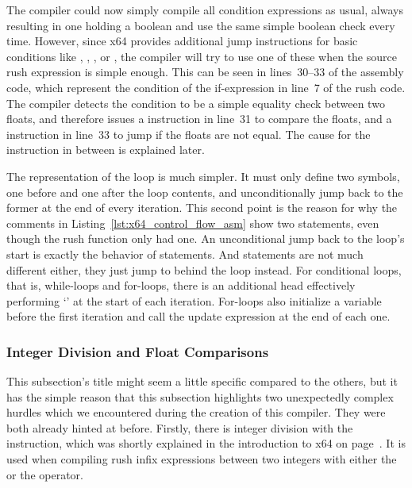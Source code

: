 The compiler could now simply compile all condition expressions as usual, always resulting in one  holding a boolean and use the same simple boolean check every time.
However, since x64 provides additional jump instructions for basic conditions like \qVerb{==}, \qVerb{!=}, \qVerb{>=}, or \qVerb{<}, the compiler will try to use one of these when the source rush expression is simple enough.
This can be seen in lines~30--33 of the assembly code, which represent the condition of the if-expression in line~7 of the rush code.
The compiler detects the condition to be a simple equality check between two floats, and therefore issues a  instruction in line~31 to compare the floats, and a  instruction in line~33 to jump if the floats are not equal.
The cause for the \label{x64_ucomisd} instruction in between is explained later.


The representation of the loop is much simpler.
It must only define two symbols, one before and one after the loop contents, and unconditionally jump back to the former at the end of every iteration.
This second point is the reason for why the comments in Listing~\ref{lst:x64_control_flow_asm} show two  statements, even though the rush function only had one.
An unconditional jump back to the loop's start is exactly the behavior of  statements.
And  statements are not much different either, they just jump to behind the loop instead.
For conditional loops, that is, while-loops and for-loops, there is an additional head effectively performing `' at the start of each iteration.
For-loops also initialize a variable before the first iteration and call the update expression at the end of each one.

\subsubsection{Integer Division and Float Comparisons}

This subsection's title might seem a little specific compared to the others, but it has the simple reason that this subsection highlights two unexpectedly complex hurdles which we encountered during the creation of this compiler.
They were both already hinted at before.
Firstly, there is integer division with the  instruction, which was shortly explained in the introduction to x64 on page~\pageref{x64_idiv}.
It is used when compiling rush infix expressions between two integers with either the \qVerb{/} or the \qVerbCmd{\%} operator.

